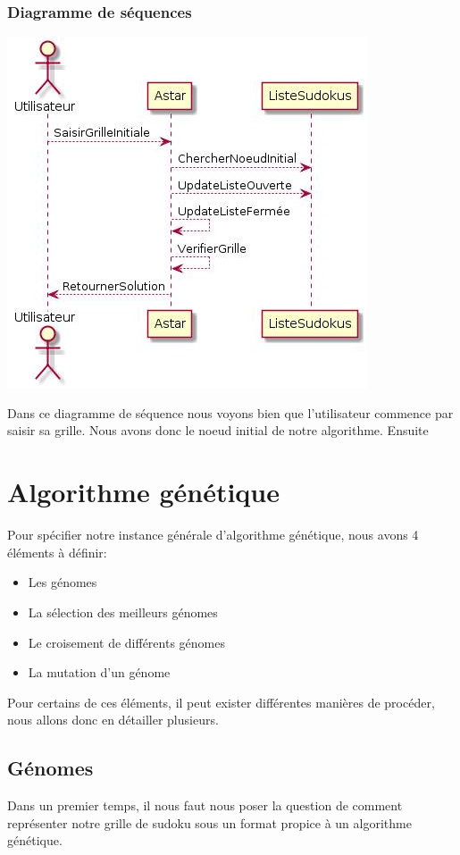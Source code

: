             \subsubsection{Diagramme de séquences}
                \begin{center}
                    \includegraphics[scale=0.5]{images/AstarDiagrammeSequences.png}
                \end{center}
                Dans ce diagramme de séquence nous voyons bien que l'utilisateur commence par saisir sa grille. Nous avons donc le noeud initial de notre algorithme. Ensuite 
    \section{Algorithme génétique}
        Pour spécifier notre instance générale d'algorithme génétique, nous avons 4 éléments à définir:
        \begin{itemize}
            \item Les génomes
            \item La sélection des meilleurs génomes
            \item Le croisement de différents génomes
            \item La mutation d'un génome
        \end{itemize}
        Pour certains de ces éléments, il peut exister différentes manières de procéder, nous allons donc en détailler plusieurs.
        \subsection{Génomes}
            Dans un premier temps, il nous faut nous poser la question de comment représenter notre grille de sudoku sous un format propice à un algorithme génétique.\\
